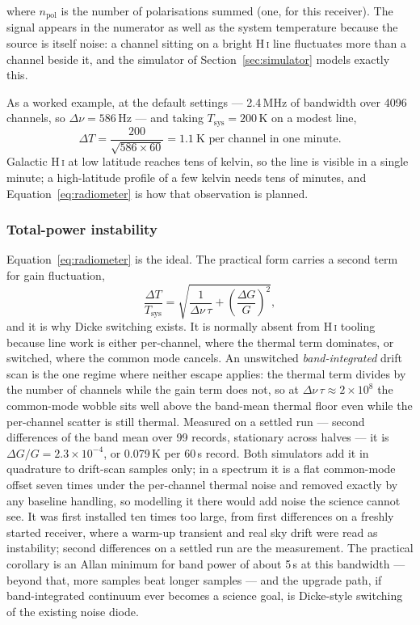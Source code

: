 \documentclass[11pt,a4paper]{article}
\begin{document}
where $n_\text{pol}$ is the number of polarisations summed (one, for this receiver). The signal appears in the numerator as well as the system temperature because the source is itself noise: a channel sitting on a bright H\,\textsc{i} line fluctuates more than a channel beside it, and the simulator of Section~\ref{sec:simulator} models exactly this.

As a worked example, at the default settings --- 2.4\,MHz of bandwidth over 4096 channels, so $\Delta\nu = 586$\,Hz --- and taking $T_\text{sys} = 200$\,K on a modest line,
\begin{equation}
\Delta T = \frac{200}{\sqrt{586 \times 60}} = 1.1\ \text{K per channel in one minute}.
\end{equation}
Galactic H\,\textsc{i} at low latitude reaches tens of kelvin, so the line is visible in a single minute; a high-latitude profile of a few kelvin needs tens of minutes, and Equation~\eqref{eq:radiometer} is how that observation is planned.

\subsubsection{Total-power instability}
\label{sec:instability}

Equation~\eqref{eq:radiometer} is the ideal. The practical form carries a second term for gain fluctuation,
\begin{equation}
\frac{\Delta T}{T_\text{sys}} = \sqrt{\frac{1}{\Delta\nu\,\tau} + \left(\frac{\Delta G}{G}\right)^2},
\label{eq:instability}
\end{equation}
and it is why Dicke switching exists. It is normally absent from H\,\textsc{i} tooling because line work is either per-channel, where the thermal term dominates, or switched, where the common mode cancels. An unswitched \emph{band-integrated} drift scan is the one regime where neither escape applies: the thermal term divides by the number of channels while the gain term does not, so at $\Delta\nu\,\tau \approx 2\times10^8$ the common-mode wobble sits well above the band-mean thermal floor even while the per-channel scatter is still thermal. Measured on a settled run --- second differences of the band mean over 99 records, stationary across halves --- it is $\Delta G/G = 2.3\times10^{-4}$, or 0.079\,K per 60\,s record. Both simulators add it in quadrature to drift-scan samples only; in a spectrum it is a flat common-mode offset seven times under the per-channel thermal noise and removed exactly by any baseline handling, so modelling it there would add noise the science cannot see. It was first installed ten times too large, from first differences on a freshly started receiver, where a warm-up transient and real sky drift were read as instability; second differences on a settled run are the measurement. The practical corollary is an Allan minimum for band power of about 5\,s at this bandwidth --- beyond that, more samples beat longer samples --- and the upgrade path, if band-integrated continuum ever becomes a science goal, is Dicke-style switching of the existing noise diode.
\end{document}

